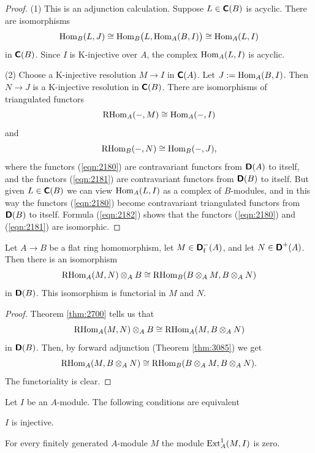 \begin{proof}
(1) This is an adjunction calculation. Suppose $L \in \boldsymbol{\mathsf{C}}(B)$ is acyclic. 
There are isomorphisms  
\begin{equation} \label{eqn:2182}
\operatorname{Hom}_B(L,J) \cong 
\operatorname{Hom}_B \bigl( L, \operatorname{Hom}_A(B, I) \bigr) \cong  
\operatorname{Hom}_A(L,I) 
\end{equation}
in $\boldsymbol{\mathsf{C}}(B)$. Since $I$ is K-injective over $A$, the complex
$\operatorname{Hom}_A(L,I)$ is acyclic. 

\medskip \noindent
(2) Choose a K-injective resolution $M \to I$ in $\boldsymbol{\mathsf{C}}(A)$. 
Let $J := \operatorname{Hom}_A(B, I)$. Then $N \to J$ is a K-injective 
resolution in 
$\boldsymbol{\mathsf{C}}(B)$. There are isomorphisms of triangulated functors 
\begin{equation} \label{eqn:2180}
\operatorname{RHom}_A(-, M) \cong \operatorname{Hom}_A(-, I) 
\end{equation}
and 
\begin{equation} \label{eqn:2181}
\operatorname{RHom}_B(-, N) \cong \operatorname{Hom}_B(-, J) ,
\end{equation}
where the functors (\ref{eqn:2180}) are contravariant functors from 
$\boldsymbol{\mathsf{D}}(A)$ to itself, and the functors (\ref{eqn:2181}) are contravariant 
functors from $\boldsymbol{\mathsf{D}}(B)$ to itself. But given $L \in \boldsymbol{\mathsf{C}}(B)$
we can view $\operatorname{Hom}_A(L, I)$ as a complex of $B$-modules, and in this way 
the functors (\ref{eqn:2180}) become contravariant triangulated functors
from $\boldsymbol{\mathsf{D}}(B)$ to itself. Formula (\ref{eqn:2182}) shows that the functors 
(\ref{eqn:2180}) and (\ref{eqn:2181}) are isomorphic.
\end{proof}

\begin{lem} \label{lem:2171}
Let $A \to B$ be a flat ring homomorphism, let 
$M \in \boldsymbol{\mathsf{D}}^{-}_{\mathrm{f}}(A)$, and let 
$N \in \boldsymbol{\mathsf{D}}^{+}(A)$. Then there is an isomorphism 
\[ \operatorname{RHom}_A(M, N) \otimes_A B \cong 
\operatorname{RHom}_B(B \otimes_A M, B \otimes_A N) \]
in $\boldsymbol{\mathsf{D}}(B)$. This isomorphism is functorial in $M$ and $N$. 
\end{lem}

\begin{proof}
Theorem \ref{thm:2700} tells us that 
\[  \operatorname{RHom}_A(M, N) \otimes_A B \cong 
\operatorname{RHom}_A(M, B \otimes_A N) \]
in $\boldsymbol{\mathsf{D}}(B)$. Then, by forward adjunction (Theorem \ref{thm:3085})
we get 
\[ \operatorname{RHom}_A(M, B \otimes_A N) \cong \operatorname{RHom}_B(B \otimes_A M, B \otimes_A N) . \]
The functoriality is clear. 
\end{proof}

\begin{lem} \label{lem:2185} 
Let $I$ be an $A$-module. The following conditions are equivalent\tup{:}
\begin{enumerate}
 $I$ is injective.

 For every finitely generated $A$-module $M$ the module 
$\operatorname{Ext}^1_A(M, I)$ is zero.  
\end{enumerate}
\end{lem}

